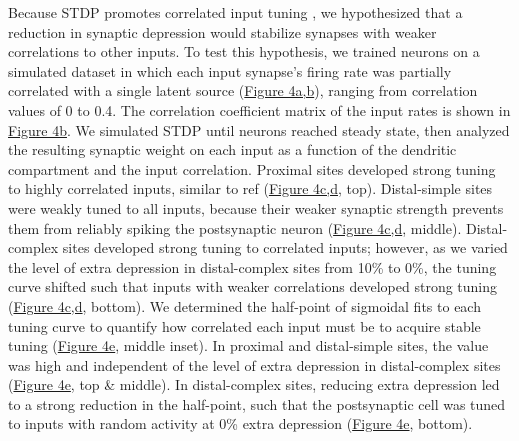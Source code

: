 \documentclass[twocolumn]{theme/bioRxiv}
\begin{document}
Because STDP promotes correlated input tuning \citep{songCompetitiveHebbianLearning2000}, we hypothesized that a reduction in synaptic depression would stabilize synapses with weaker correlations to other inputs. To test this hypothesis, we trained neurons on a simulated dataset in which each input synapse's firing rate was partially correlated with a single latent source (\hyperref[fig:4]{Figure 4a,b}), ranging from correlation values of 0 to 0.4. The correlation coefficient matrix of the input rates is shown in \hyperref[fig:4]{Figure 4b}. We simulated STDP until neurons reached steady state, then analyzed the resulting synaptic weight on each input as a function of the dendritic compartment and the input correlation. Proximal sites developed strong tuning to highly correlated inputs, similar to ref \citep{songCompetitiveHebbianLearning2000} (\hyperref[fig:4]{Figure 4c,d}, top). Distal-simple sites were weakly tuned to all inputs, because their weaker synaptic strength prevents them from reliably spiking the postsynaptic neuron (\hyperref[fig:4]{Figure 4c,d}, middle). Distal-complex sites developed strong tuning to correlated inputs; however, as we varied the level of extra depression in distal-complex sites from 10\% to 0\%, the tuning curve shifted such that inputs with weaker correlations developed strong tuning (\hyperref[fig:4]{Figure 4c,d}, bottom). We determined the half-point of sigmoidal fits to each tuning curve to quantify how correlated each input must be to acquire stable tuning (\hyperref[fig:4]{Figure 4e}, middle inset). In proximal and distal-simple sites, the value was high and independent of the level of extra depression in distal-complex sites (\hyperref[fig:4]{Figure 4e}, top \& middle). In distal-complex sites, reducing extra depression led to a strong reduction in the half-point, such that the postsynaptic cell was tuned to inputs with random activity at 0\% extra depression (\hyperref[fig:4]{Figure 4e}, bottom). 
\end{document}
